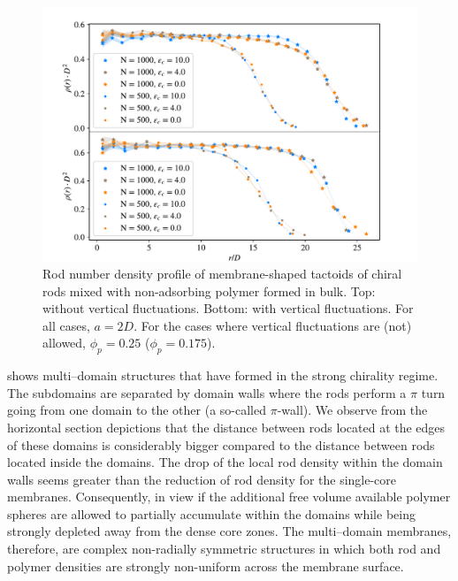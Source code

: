 \begin{figure}
\includegraphics[width= .9\columnwidth]{figures/chapter-5/density}
	\caption[Rod number density profile]{Rod number density profile of membrane-shaped tactoids of chiral rods mixed with non-adsorbing polymer formed in bulk. Top: without vertical fluctuations. Bottom: with vertical fluctuations. For all cases, $a = 2D$. For the cases where vertical fluctuations are (not) allowed, $\phi_p=0.25$ ($\phi_p=0.175$). }
 \label{density}
\end{figure}

 shows multi--domain structures that have formed in the strong chirality regime. The subdomains are separated by domain walls where the rods perform a $\pi$ turn going from one domain to the other (a so-called $\pi$-wall).  We  observe from the horizontal section depictions that the distance between rods located at the edges of these domains is considerably bigger compared to the distance between rods located inside the domains. The drop of the local rod density within the domain walls seems greater than the reduction of rod density for the single-core membranes. Consequently, in view if the additional free volume available   polymer spheres are allowed to partially accumulate within the domains  while being strongly depleted away from the dense core zones. The multi--domain membranes, therefore, are complex non-radially symmetric structures in which both rod and polymer densities are strongly non-uniform across the membrane surface.  



